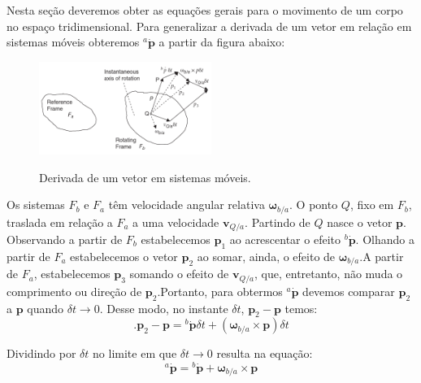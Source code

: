 Nesta seção deveremos obter as equações gerais para o movimento de um corpo no espaço tridimensional. Para generalizar a derivada de um vetor em relação em sistemas móveis obteremos \(^{a}\dot{\mathbf{p}}\) a partir da figura abaixo:
\begin{figure}[H]
    \centering
    \includegraphics[width=0.5\textwidth, keepaspectratio]{figuras/figure1.4-1.png}\label{fig1.4-1}
    \caption{Derivada de um vetor em sistemas móveis.}
\end{figure}

Os sistemas \(F_{b}\) e \(F_{a}\) têm velocidade angular relativa \(\mathbf{\omega}_{b/a}\). O ponto \(Q\), fixo em \(F_{b}\), traslada em relação a \(F_{a}\) a uma velocidade \(\mathbf{v}_{Q/a}\). Partindo de  \(Q\) nasce o vetor \(\mathbf{p}\). Observando a partir de \(F_{b}\) estabelecemos \(\mathbf{p}_{1}\) ao acrescentar o efeito \({^b\dot{\mathbf{p}}}\). Olhando a partir de \(F_{a}\) estabelecemos o vetor  \(\mathbf{p}_{2}\) ao somar, ainda, o efeito de \(\mathbf{\omega}_{b/a}\).A partir de \(F_{a}\), estabelecemos \(\mathbf{p}_{3}\) somando o efeito de \(\mathbf{v}_{Q/a}\), que, entretanto, não muda o comprimento ou direção de \(\mathbf{p}_{2}\).Portanto, para obtermos \(^{a}\dot{\mathbf{p}}\) devemos  comparar \(\mathbf{p}_{2}\) a \(\mathbf{p}\) quando \(\delta t \rightarrow 0\). Desse modo, no instante \(\delta t\), \(\mathbf{p}_{2} \!-\! \mathbf{p}\) temos: 
\begin{equation*}.
    \mathbf{p}_{2} - \mathbf{p} = {^{b}\dot{\mathbf{p}}} \delta t + \left( \mathbf{\omega}_{b/a} \! \times \!\mathbf{p} \right) \delta t
\end{equation*}

Dividindo por \(\delta t\) no limite em que \(\delta t \rightarrow 0\) resulta na equação\footnotemark{}:
\begin{equation*} \tag{1.4-2}
    {^{a}\dot{\mathbf{p}}} = {^{b}\dot{\mathbf{p}}} + {\mathbf{\omega}_{b/a} \! \times \!\mathbf{p}}
\end{equation*}


